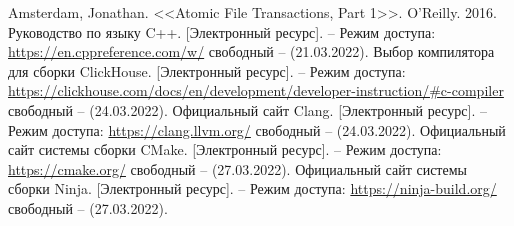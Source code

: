 \begin{thebibliography}{}
    Amsterdam, Jonathan. <<Atomic File Transactions, Part 1>>. O'Reilly. 2016.
    Руководство по языку C++. [Электронный ресурс]. – Режим доступа: \url{https://en.cppreference.com/w/} свободный – (21.03.2022).
    Выбор компилятора для сборки ClickHouse. [Электронный ресурс]. – Режим доступа: \url{https://clickhouse.com/docs/en/development/developer-instruction/#c-compiler} свободный – (24.03.2022).
    Официальный сайт Clang. [Электронный ресурс]. – Режим доступа: \url{https://clang.llvm.org/} свободный – (24.03.2022).
    Официальный сайт системы сборки CMake. [Электронный ресурс]. – Режим доступа: \url{https://cmake.org/} свободный – (27.03.2022).
    Официальный сайт системы сборки Ninja. [Электронный ресурс]. – Режим доступа: \url{https://ninja-build.org/} свободный – (27.03.2022).
\end{thebibliography}
\endgroup

\pagebreak